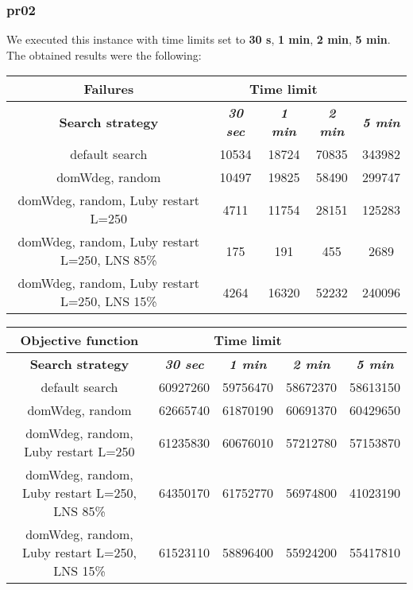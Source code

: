 \subsubsection{pr02}
We executed this instance with time limits set to \textbf{30 s}, \textbf{1 min}, \textbf{2 min}, \textbf{5 min}.\\
The obtained results were the following:
{
\renewcommand{\arraystretch}{2}
\begin{longtable}[h]{| c | c | c | c | c |}
    \hline
    \textbf{Failures} & \multicolumn{3}{c}{Time limit} & \\
    \hline
    \textbf{Search strategy} & \textbf{\textit{30 sec}} & \textbf{\textit{1 min}} & \textbf{\textit{2 min}} & \textbf{\textit{5 min}} \\
    \hline
    \endhead
    default search                                & 10534 & 18724 & 70835 & 343982 \\
    \hline
    domWdeg, random                               & 10497 & 19825 & 58490 & 299747 \\
    \hline
    domWdeg, random, Luby restart L=250           &  4711 & 11754 & 28151 & 125283 \\
    \hline
    domWdeg, random, Luby restart L=250, LNS 85\% &   175 &   191 &   455 &   2689 \\
    \hline
    domWdeg, random, Luby restart L=250, LNS 15\% &  4264 & 16320 & 52232 & 240096 \\
    \hline
\end{longtable}
}

{
\renewcommand{\arraystretch}{2}
\begin{longtable}[h]{| c | c | c | c | c |}
    \hline
    \textbf{Objective function} & \multicolumn{3}{c}{Time limit} & \\
    \hline
    \textbf{Search strategy} & \textbf{\textit{30 sec}} & \textbf{\textit{1 min}} & \textbf{\textit{2 min}} & \textbf{\textit{5 min}} \\
    \hline
    \endhead
    default search                                & 60927260 & 59756470 & 58672370 & 58613150 \\
    \hline
    domWdeg, random                               & 62665740 & 61870190 & 60691370 & 60429650 \\
    \hline
    domWdeg, random, Luby restart L=250           & 61235830 & 60676010 & 57212780 & 57153870 \\
    \hline
    domWdeg, random, Luby restart L=250, LNS 85\% & 64350170 & 61752770 & 56974800 & 41023190 \\
    \hline
    domWdeg, random, Luby restart L=250, LNS 15\% & 61523110 & 58896400 & 55924200 & 55417810 \\
    \hline
\end{longtable}
}